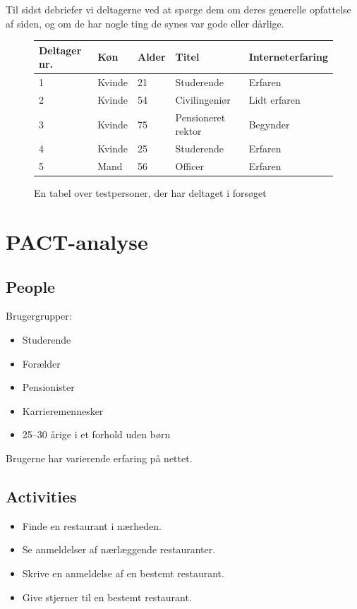 \documentclass[a4paper, 12pt]{article}
\begin{document}
Til sidst debriefer vi deltagerne ved at spørge dem om deres generelle
opfattelse af siden, og om de har nogle ting de synes var gode eller dårlige.

\begin{figure}[htbp]
  \centering
  \begin{tabular}{ l l l l l }
    \textbf{Deltager nr.} & \textbf{Køn}   & \textbf{Alder} & \textbf{Titel} &
    \textbf{Interneterfaring} \\
    \midrule
    1            & Kvinde & 21    & Studerende          & Erfaren         \\
    2            & Kvinde & 54    & Civilingeniør       & Lidt erfaren    \\
    3            & Kvinde & 75    & Pensioneret rektor  & Begynder        \\
    4            & Kvinde & 25    & Studerende          & Erfaren         \\
    5            & Mand   & 56    & Officer             & Erfaren         \\
  \end{tabular}
  \caption{En tabel over testpersoner, der har deltaget i forsøget}
  \label{tab:testpersoner}
\end{figure}



\section{PACT-analyse}

\subsection{People}

Brugergrupper:
\begin{itemize}
\item Studerende
\item Forælder
\item Pensionister
\item Karrieremennesker
\item 25--30 årige i et forhold uden børn
\end{itemize}
Brugerne har varierende erfaring på nettet.

\subsection{Activities}

\begin{itemize}
\item Finde en restaurant i nærheden.
\item Se anmeldelser af nærlæggende restauranter.
\item Skrive en anmeldelse af en bestemt restaurant.
\item Give stjerner til en bestemt restaurant.
\end{itemize}
\end{document}
